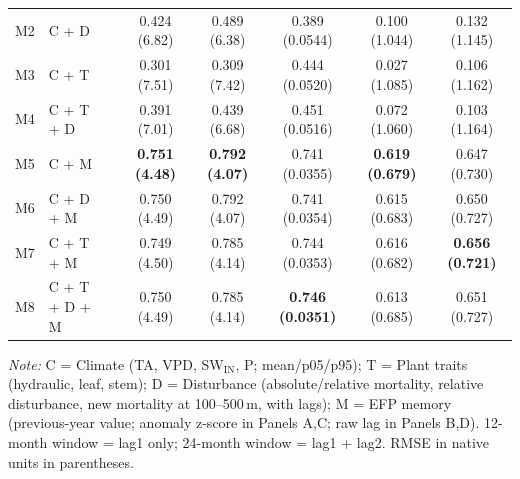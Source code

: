 \begin{table}[htbp]
\begin{tabular}{llcccccc}
M2 & C + D &  & 0.424 (6.82) & 0.489 (6.38) & 0.389 (0.0544) & 0.100 (1.044) & 0.132 (1.145) \\
M3 & C + T &  & 0.301 (7.51) & 0.309 (7.42) & 0.444 (0.0520) & 0.027 (1.085) & 0.106 (1.162) \\
M4 & C + T + D &  & 0.391 (7.01) & 0.439 (6.68) & 0.451 (0.0516) & 0.072 (1.060) & 0.103 (1.164) \\
M5 & C + M &  & \textbf{0.751 (4.48)} & \textbf{0.792 (4.07)} & 0.741 (0.0355) & \textbf{0.619 (0.679)} & 0.647 (0.730) \\
M6 & C + D + M &  & 0.750 (4.49) & 0.792 (4.07) & 0.741 (0.0354) & 0.615 (0.683) & 0.650 (0.727) \\
M7 & C + T + M &  & 0.749 (4.50) & 0.785 (4.14) & 0.744 (0.0353) & 0.616 (0.682) & \textbf{0.656 (0.721)} \\
M8 & C + T + D + M &  & 0.750 (4.49) & 0.785 (4.14) & \textbf{0.746 (0.0351)} & 0.613 (0.685) & 0.651 (0.727) \\
\midrule
\bottomrule
\end{tabular}
\vspace{2pt}
\begin{minipage}{\linewidth}
\footnotesize
\textit{Note:} C = Climate (TA, VPD, SW$_\mathrm{IN}$, P; mean/p05/p95); T = Plant traits (hydraulic, leaf, stem); D = Disturbance (absolute/relative mortality, relative disturbance, new mortality at 100--500\,m, with lags); M = EFP memory (previous-year value; anomaly z-score in Panels A,C; raw lag in Panels B,D). 12-month window = lag1 only; 24-month window = lag1 + lag2. RMSE in native units in parentheses.
\end{minipage}
\end{table}

